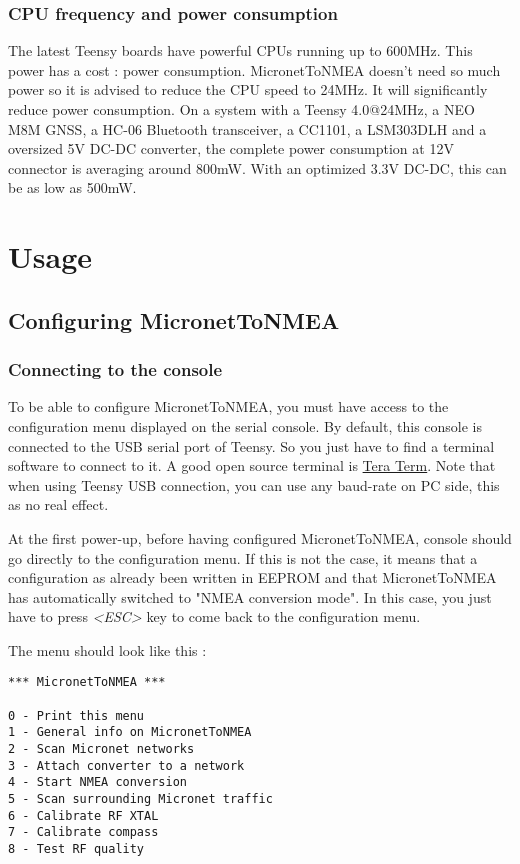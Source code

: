 \documentclass{report}
\begin{document}
\subsection{CPU frequency and power consumption}
The latest Teensy boards have powerful CPUs running up to 600MHz. This power has a cost : power consumption. MicronetToNMEA doesn't need so much power so it is advised to reduce the CPU speed to 24MHz. It will significantly reduce power consumption.
On a system with a Teensy 4.0@24MHz, a NEO M8M GNSS, a HC-06 Bluetooth transceiver, a CC1101, a LSM303DLH and a oversized 5V DC-DC converter, the complete power consumption at 12V connector is averaging around 800mW. With an optimized 3.3V DC-DC, this can be as low as 500mW.

\chapter{Usage}

\section{Configuring MicronetToNMEA}

\subsection{Connecting to the console}

To be able to configure MicronetToNMEA, you must have access to the configuration menu displayed on the serial console. By default, this console is connected to the USB serial port of Teensy. So you just have to find a terminal software to connect to it. A good open source terminal is \href{http://www.teraterm.org/}{Tera Term}. Note that when using Teensy USB connection, you can use any baud-rate on PC side, this as no real effect.

At the first power-up, before having configured MicronetToNMEA, console should go directly to the configuration menu. If this is not the case, it means that a configuration as already been written in EEPROM and that MicronetToNMEA has automatically switched to "NMEA conversion mode". In this case, you just have to press \emph{<ESC>} key to come back to the configuration menu.

The menu should look like this :

\begin{verbatim}
*** MicronetToNMEA ***

0 - Print this menu
1 - General info on MicronetToNMEA
2 - Scan Micronet networks
3 - Attach converter to a network
4 - Start NMEA conversion
5 - Scan surrounding Micronet traffic
6 - Calibrate RF XTAL
7 - Calibrate compass
8 - Test RF quality
\end{verbatim}
\end{document}
